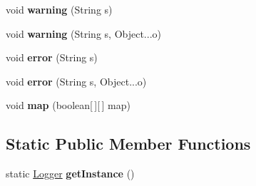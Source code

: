 \begin{DoxyCompactItemize}
\item 
\hypertarget{classdev_1_1boxy_1_1fortyfive_1_1utils_1_1_logger_a85967605856481ddab885a504c8e25aa}{
void {\bfseries warning} (String s)}
\label{d8/d25/classdev_1_1boxy_1_1fortyfive_1_1utils_1_1_logger_a85967605856481ddab885a504c8e25aa}

\item 
\hypertarget{classdev_1_1boxy_1_1fortyfive_1_1utils_1_1_logger_a884122ad45b259c9bbd6746289c48dd9}{
void {\bfseries warning} (String s, Object...o)}
\label{d8/d25/classdev_1_1boxy_1_1fortyfive_1_1utils_1_1_logger_a884122ad45b259c9bbd6746289c48dd9}

\item 
\hypertarget{classdev_1_1boxy_1_1fortyfive_1_1utils_1_1_logger_a7a4b15936a4020922eeb0f3442e070a1}{
void {\bfseries error} (String s)}
\label{d8/d25/classdev_1_1boxy_1_1fortyfive_1_1utils_1_1_logger_a7a4b15936a4020922eeb0f3442e070a1}

\item 
\hypertarget{classdev_1_1boxy_1_1fortyfive_1_1utils_1_1_logger_aaa7fcff82d66ef6b879c654df626530a}{
void {\bfseries error} (String s, Object...o)}
\label{d8/d25/classdev_1_1boxy_1_1fortyfive_1_1utils_1_1_logger_aaa7fcff82d66ef6b879c654df626530a}

\item 
\hypertarget{classdev_1_1boxy_1_1fortyfive_1_1utils_1_1_logger_a44c9fa6cb0ddf7ff9c1f6aeb0533b59f}{
void {\bfseries map} (boolean\mbox{[}$\,$\mbox{]}\mbox{[}$\,$\mbox{]} map)}
\label{d8/d25/classdev_1_1boxy_1_1fortyfive_1_1utils_1_1_logger_a44c9fa6cb0ddf7ff9c1f6aeb0533b59f}

\end{DoxyCompactItemize}
\subsection*{Static Public Member Functions}
\begin{DoxyCompactItemize}
\item 
\hypertarget{classdev_1_1boxy_1_1fortyfive_1_1utils_1_1_logger_af9426d9cac861bad714514b53142949b}{
static \hyperlink{classdev_1_1boxy_1_1fortyfive_1_1utils_1_1_logger}{Logger} {\bfseries getInstance} ()}
\label{d8/d25/classdev_1_1boxy_1_1fortyfive_1_1utils_1_1_logger_af9426d9cac861bad714514b53142949b}

\end{DoxyCompactItemize}

